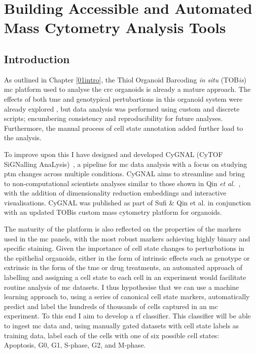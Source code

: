 \chapter{Building Accessible and Automated Mass Cytometry Analysis Tools}
\label{03cytof}

\newpage
\section{Introduction}


As outlined in Chapter \ref{01intro}, the Thiol Organoid Barcoding \textit{in situ} (TOB\textit{is}) \acrfull{mc} platform used to analyse the \acrfull{crc} organoids is already a mature approach. The effects of both \acrfull{tme} and genotypical pertubartions in this organoid system were already explored \cite{qin_cell-type-specific_2020}, but data analysis was performed using custom and discrete scripts; encumbering consistency and reproducibility for future analyses. Furthermore, the manual process of cell state annotation added further load to the analysis.

To improve upon this I have designed and developed CyGNAL (CyTOF SiGNalling AnaLysis)~\cite{ferran_cardoso_tape-labcygnal_2021}, a pipeline for \acrshort{mc} data analysis with a focus on studying \acrfull{ptm} changes across multiple conditions. CyGNAL aims to streamline and bring to non-computational scientists analyses similar to those shown in Qin \emph{et al.}~\cite{qin_cell-type-specific_2020}, with the addition of dimensionality reduction embeddings and interactive visualisations. CyGNAL was published as part of Sufi \& Qin et al. \cite{sufi_multiplexed_2021} in conjunction with an updated TOBis custom mass cytometry platform for organoids.

The maturity of the platform is also reflected on the properties of the markers used in the \acrshort{mc} panels, with the most robust markers achieving highly binary and specific staining. Given the importance of cell state changes to perturbations in the epithelial organoids, either in the form of intrinsic effects such as genotype or extrinsic in the form of the \acrshort{tme} or drug treatments, an automated approach of labelling and assigning a cell state to each cell in an experiment would facilitate routine analysis of \acrshort{mc} datasets. 
I thus hypothesise that we can use a machine learning approach to, using a series of canonical cell state markers, automatically predict and label the hundreds of thousands of cells captured in an \acrshort{mc} experiment. To this end I aim to develop a \acrfull{rf} classifier. This classifier will be able to ingest \acrshort{mc} data and, using manually gated datasets with cell state labels as training data, label each of the cells with one of six possible cell states: Apoptosis, G0, G1, S-phase, G2, and M-phase. 

